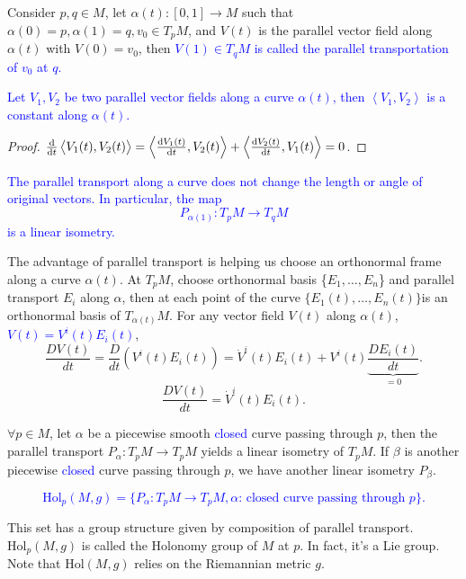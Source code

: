 Consider \(p,q\in M\), let \(\alpha(t)\colon[0,1]\to M\) such that 
\(\alpha(0)=p,\alpha(1)=q,v_0\in T_p M\), and \(V(t)\) is the parallel 
vector field along \(\alpha(t)\) with \(V(0)=v_0\), then 
\textcolor{blue}{
    \(V(1)\in T_q M\) is called the parallel transportation of 
    \(v_0\) at \(q\).
}
\textcolor{blue}{
    \begin{proposition}
        Let \(V_1,V_2\) be two parallel vector fields along a curve 
        \(\alpha(t)\), then \(\left\langle V_1,V_2 \right\rangle\)
        is a constant along \(\alpha(t)\).
    \end{proposition}
}
\begin{proof}
    \(\dv{t}\left\langle V_1(t),V_2(t)\right\rangle
    =\left\langle\dv{V_1(t)}{t},V_2(t)\right\rangle
    +\left\langle\dv{V_2(t)}{t},V_1(t)\right\rangle
    =0\).
\end{proof}
\textcolor{blue}{
    \begin{corollary}
        The parallel transport along a curve does not
        change the length or angle of original vectors.
        In particular, the map 
        \[  
            P_{\alpha(1)}\colon T_p M\to T_q M
            \]
            is a linear isometry.
    \end{corollary}
}
\begin{remark}
    The advantage of parallel transport is helping us choose an
    orthonormal frame along a curve \(\alpha(t)\). At \(T_p M\),
    choose orthonormal basis \{\(E_1,\ldots,E_n\)\} and parallel
    transport \(E_i\) along \(\alpha\), then at each point 
    of the curve \(\{E_1(t),\ldots,E_n(t)\}\)is an orthonormal basis
    of \(T_{\alpha(t)}M\). For any vector field \(V(t)\) along
    \(\alpha(t)\), \textcolor{blue}{\(V(t)=V^i(t)E_i(t)\)},
    \[
        \frac{DV(t)}{dt}=\frac{D}{dt}\left(
            V^i(t)E_i(t)
        \right)    
        =\dot{V}^i(t)E_i(t)+V^i(t)\underbrace{\frac{DE_i(t)}{dt}}_{=0}.
    \]
    \[
        \frac{DV(t)}{dt}=\dot{V}^i(t)E_i(t).
    \]
\end{remark}
\begin{remark}
    \(\forall p\in M\), let \(\alpha\) be a piecewise 
    smooth \textcolor{blue}{closed} curve  passing through \(p\),
    then the parallel transport \(P_\alpha\colon T_p M\to T_p M\)
    yields a linear isometry of \(T_p M\). If \(\beta\) is another
    piecewise \textcolor{blue}{closed} curve passing through \(p\),
    we have another linear isometry \(P_\beta\).
\end{remark}
\textcolor{blue}{
    \begin{definition}
        \[\mathrm{Hol}_p(M,g)=\{P_\alpha\colon T_p M\to T_p M,
        \alpha\text{: closed curve passing
        through }p\}.\]
    \end{definition}
}
This set has a group structure given by composition of parallel transport.
\(\mathrm{Hol}_p(M,g)\) is called the Holonomy group of \(M\) at \(p\).
In fact, it's a Lie group. Note that \(\mathrm{Hol}(M,g)\) relies on 
the Riemannian metric \(g\).\

